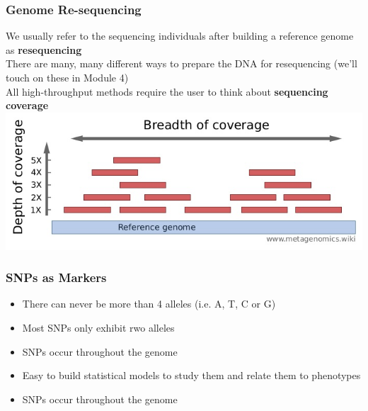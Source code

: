\documentclass{beamer}
\begin{document}
\begin{frame}
	\frametitle{Genome Re-sequencing}
	
	We usually refer to the sequencing individuals after building a reference genome as \textbf{resequencing}\\
\vspace{5pt}
	There are many, many different ways to prepare the DNA for resequencing (we'll touch on these in Module 4)\\
\vspace{5pt}
	All high-throughput methods require the user to think about \textbf{sequencing coverage}\\
\vspace{5pt}
			\includegraphics[keepaspectratio, width  = \textwidth]{img/depthBreadth}
	
	
\end{frame}

\begin{frame}
\frametitle{SNPs as Markers}
\begin{itemize}
	\item There can never be more than 4 alleles (i.e. A, T, C or G)
	\item Most SNPs only exhibit rwo alleles
		\item SNPs occur throughout the genome
		\item Easy to build statistical models to study them and relate them to phenotypes
		\item SNPs occur throughout the genome
		
\end{itemize}
\end{frame}
\end{document}
